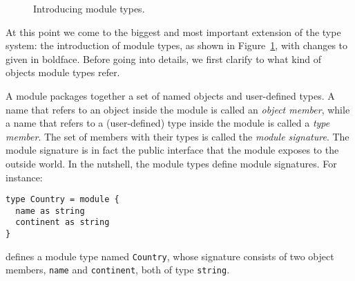 \documentclass[droidmono,libertine,twoside,user,unofficial]{ecarticle}
\def\<#1>{\synt{#1}}
\newcommand{\optSemiCol}{\begin{stack}\\`;'\end{stack}}
\begin{document}
\begin{figure}[t]



  \caption{Introducing module types.}
  \label{fig:module-type-grammar}
\end{figure}

At this point we come to the biggest and most important extension of
the type system: the introduction of module types, as shown in
Figure~\ref{fig:module-type-grammar}, with changes to \<type-factor>
given in boldface.  Before going into details, we first clarify to
what kind of objects module types refer.

A module packages together a set of named objects and user-defined
types.  A name that refers to an object inside the module is called an
\emph{object member}, while a name that refers to a (user-defined)
type inside the module is called a \emph{type member}.  The set of
members with their types is called the \emph{module signature}.  The
module signature is in fact the public interface that the module
exposes to the outside world.  In the nutshell, the module types
define module signatures.  For instance:
\begin{lstlisting}
type Country = module {
  name as string
  continent as string
}
\end{lstlisting}
defines a module type named \texttt{Country}, whose signature consists
of two object members, \texttt{name} and \texttt{continent}, both of
type \texttt{string}.
\end{document}
